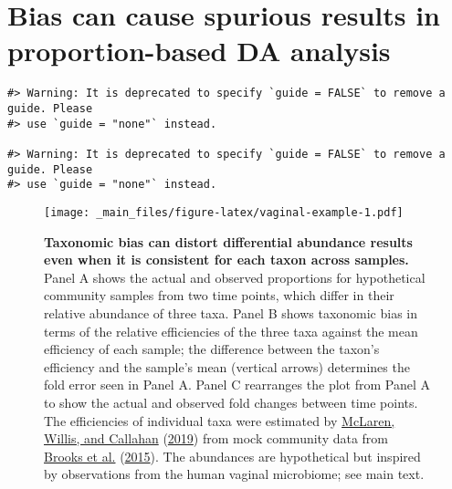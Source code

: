\documentclass[
]{article}
\theoremstyle{definition}
\theoremstyle{definition}
\theoremstyle{definition}
\theoremstyle{definition}
\theoremstyle{remark}
\begin{document}
\hypertarget{bias-can-cause-spurious-results-in-proportion-based-da-analysis}{%
\section{Bias can cause spurious results in proportion-based DA analysis}\label{bias-can-cause-spurious-results-in-proportion-based-da-analysis}}

\begin{verbatim}
#> Warning: It is deprecated to specify `guide = FALSE` to remove a guide. Please
#> use `guide = "none"` instead.

#> Warning: It is deprecated to specify `guide = FALSE` to remove a guide. Please
#> use `guide = "none"` instead.
\end{verbatim}

\begin{figure}
\centering
\texttt{[image: \_main\_files/figure-latex/vaginal-example-1.pdf]}
\caption{\label{fig:vaginal-example}\textbf{Taxonomic bias can distort differential abundance results even when it is consistent for each taxon across samples.} Panel A shows the actual and observed proportions for hypothetical community samples from two time points, which differ in their relative abundance of three taxa. Panel B shows taxonomic bias in terms of the relative efficiencies of the three taxa against the mean efficiency of each sample; the difference between the taxon's efficiency and the sample's mean (vertical arrows) determines the fold error seen in Panel A. Panel C rearranges the plot from Panel A to show the actual and observed fold changes between time points. The efficiencies of individual taxa were estimated by \protect\hyperlink{ref-mclaren2019cons}{McLaren, Willis, and Callahan} (\protect\hyperlink{ref-mclaren2019cons}{2019}) from mock community data from \protect\hyperlink{ref-brooks2015thet}{Brooks et al.} (\protect\hyperlink{ref-brooks2015thet}{2015}). The abundances are hypothetical but inspired by observations from the human vaginal microbiome; see main text.}
\end{figure}
\end{document}
